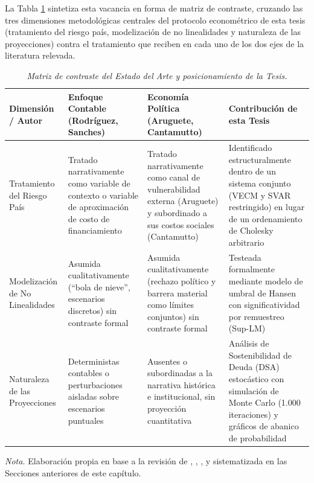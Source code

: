 La Tabla \ref{tab:contraste_estado_arte} sintetiza esta vacancia en forma de matriz de contraste, cruzando las tres dimensiones metodológicas centrales del protocolo econométrico de esta tesis (tratamiento del riesgo país, modelización de no linealidades y naturaleza de las proyecciones) contra el tratamiento que reciben en cada uno de los dos ejes de la literatura relevada.

\begin{table}[H]
\centering
\caption{\label{tab:contraste_estado_arte} \textit{Matriz de contraste del Estado del Arte y posicionamiento de la Tesis.}}
\begin{tabular}{p{3.1cm}p{3.6cm}p{3.6cm}p{3.9cm}}
\toprule
\textbf{Dimensión / Autor} & \textbf{Enfoque Contable (Rodríguez, Sanches)} & \textbf{Economía Política (Aruguete, Cantamutto)} & \textbf{Contribución de esta Tesis} \\
\midrule
Tratamiento del Riesgo País & Tratado narrativamente como variable de contexto o variable de aproximación de costo de financiamiento & Tratado narrativamente como canal de vulnerabilidad externa (Aruguete) y subordinado a sus costos sociales (Cantamutto) & Identificado estructuralmente dentro de un sistema conjunto (VECM y SVAR restringido) en lugar de un ordenamiento de Cholesky arbitrario \\
Modelización de No Linealidades & Asumida cualitativamente (``bola de nieve'', escenarios discretos) sin contraste formal & Asumida cualitativamente (rechazo político y barrera material como límites conjuntos) sin contraste formal & Testeada formalmente mediante modelo de umbral de Hansen con significatividad por remuestreo (Sup-LM) \\
Naturaleza de las Proyecciones & Deterministas contables o perturbaciones aisladas sobre escenarios puntuales & Ausentes o subordinadas a la narrativa histórica e institucional, sin proyección cuantitativa & Análisis de Sostenibilidad de Deuda (DSA) estocástico con simulación de Monte Carlo (1.000 iteraciones) y gráficos de abanico de probabilidad \\
\bottomrule
\end{tabular}
\begin{flushleft}
\footnotesize \textit{Nota.} Elaboración propia en base a la revisión de \citet{rodriguez2023}, \citet{sanches2019}, \citet{aruguete2021}, \citet{bohoslavsky2024} y \citet{cantamutto2024} sistematizada en las Secciones anteriores de este capítulo.
\end{flushleft}
\end{table}

